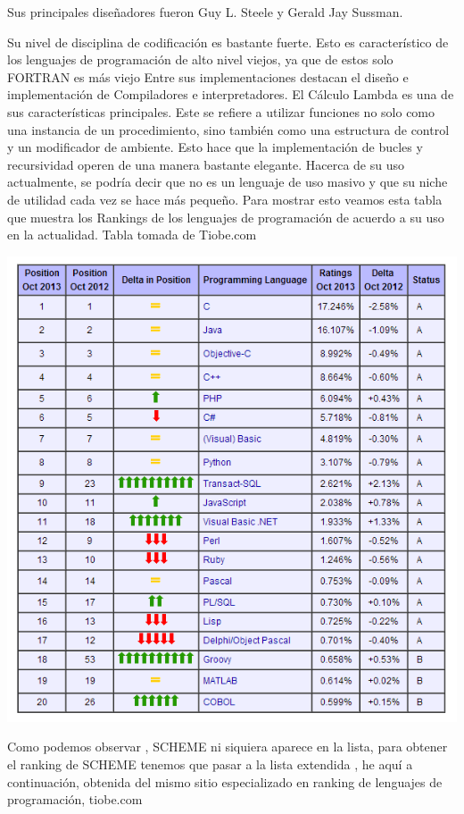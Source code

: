 \documentclass[11pt]{article} %
\begin{document}
Sus principales diseñadores fueron Guy L. Steele y Gerald Jay Sussman.

Su nivel de disciplina de codificación es bastante fuerte. Esto es característico de los lenguajes de programación de alto nivel viejos, ya que de estos solo FORTRAN es más viejo
Entre sus implementaciones destacan el diseño e implementación de Compiladores e interpretadores.
El Cálculo Lambda es una de sus características principales. Este se refiere a utilizar funciones no solo como una instancia de un procedimiento, sino también como una estructura de control y un modificador de ambiente. Esto hace que la implementación de bucles y recursividad operen de una manera bastante elegante.
Hacerca de su uso actualmente, se podría decir que no es un lenguaje de uso masivo y que su niche de utilidad cada vez se hace más pequeño. Para mostrar esto veamos esta tabla que muestra los Rankings de los lenguajes de programación de acuerdo a su uso en la actualidad. Tabla tomada de Tiobe.com

\includegraphics[width=14cm]{imagenes/ranking.png}

Como podemos observar , SCHEME ni siquiera aparece en la lista, para obtener el ranking de SCHEME tenemos que pasar a la lista extendida , he aquí a continuación, obtenida del mismo sitio especializado en ranking de lenguajes de programación, tiobe.com
\end{document}
